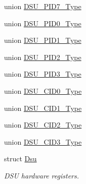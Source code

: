 \begin{DoxyCompactItemize}
union \hyperlink{union_d_s_u___p_i_d7___type}{D\+S\+U\+\_\+\+P\+I\+D7\+\_\+\+Type}
\item 
union \hyperlink{union_d_s_u___p_i_d0___type}{D\+S\+U\+\_\+\+P\+I\+D0\+\_\+\+Type}
\item 
union \hyperlink{union_d_s_u___p_i_d1___type}{D\+S\+U\+\_\+\+P\+I\+D1\+\_\+\+Type}
\item 
union \hyperlink{union_d_s_u___p_i_d2___type}{D\+S\+U\+\_\+\+P\+I\+D2\+\_\+\+Type}
\item 
union \hyperlink{union_d_s_u___p_i_d3___type}{D\+S\+U\+\_\+\+P\+I\+D3\+\_\+\+Type}
\item 
union \hyperlink{union_d_s_u___c_i_d0___type}{D\+S\+U\+\_\+\+C\+I\+D0\+\_\+\+Type}
\item 
union \hyperlink{union_d_s_u___c_i_d1___type}{D\+S\+U\+\_\+\+C\+I\+D1\+\_\+\+Type}
\item 
union \hyperlink{union_d_s_u___c_i_d2___type}{D\+S\+U\+\_\+\+C\+I\+D2\+\_\+\+Type}
\item 
union \hyperlink{union_d_s_u___c_i_d3___type}{D\+S\+U\+\_\+\+C\+I\+D3\+\_\+\+Type}
\item 
struct \hyperlink{struct_dsu}{Dsu}
\begin{DoxyCompactList}\small\item\em D\+S\+U hardware registers. \end{DoxyCompactList}\end{DoxyCompactItemize}
